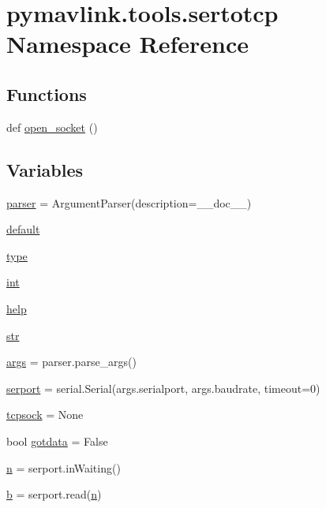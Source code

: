 \hypertarget{namespacepymavlink_1_1tools_1_1sertotcp}{}\section{pymavlink.\+tools.\+sertotcp Namespace Reference}
\label{namespacepymavlink_1_1tools_1_1sertotcp}
\subsection*{Functions}
\begin{DoxyCompactItemize}
\item 
def \mbox{\hyperlink{namespacepymavlink_1_1tools_1_1sertotcp_acea7267f0cbd70801a3173f386311131}{open\+\_\+socket}} ()
\end{DoxyCompactItemize}
\subsection*{Variables}
\begin{DoxyCompactItemize}
\item 
\mbox{\hyperlink{namespacepymavlink_1_1tools_1_1sertotcp_aa3dd094c6098a72b58a58bcedfee06ba}{parser}} = Argument\+Parser(description=\+\_\+\+\_\+doc\+\_\+\+\_\+)
\item 
\mbox{\hyperlink{namespacepymavlink_1_1tools_1_1sertotcp_a5155d3e9f5af677146f4631236d6db70}{default}}
\item 
\mbox{\hyperlink{namespacepymavlink_1_1tools_1_1sertotcp_a3e5a0995f5e8308207e66eb4b62913a2}{type}}
\item 
\mbox{\hyperlink{namespacepymavlink_1_1tools_1_1sertotcp_acc958c5fc9b5c4b8795b1b610ea3fdd4}{int}}
\item 
\mbox{\hyperlink{namespacepymavlink_1_1tools_1_1sertotcp_a4910fcac8e670df1cda872ceae80866a}{help}}
\item 
\mbox{\hyperlink{namespacepymavlink_1_1tools_1_1sertotcp_a36c01b1b7be097afcc65c2b1a0aaacbf}{str}}
\item 
\mbox{\hyperlink{namespacepymavlink_1_1tools_1_1sertotcp_ab233978b338bba7bac90e2e0ec6e4426}{args}} = parser.\+parse\+\_\+args()
\item 
\mbox{\hyperlink{namespacepymavlink_1_1tools_1_1sertotcp_ad5c3bf7886d1b09611a8fa7439774576}{serport}} = serial.\+Serial(args.\+serialport, args.\+baudrate, timeout=0)
\item 
\mbox{\hyperlink{namespacepymavlink_1_1tools_1_1sertotcp_ab50c30caa18849d8693fd3e379765605}{tcpsock}} = None
\item 
bool \mbox{\hyperlink{namespacepymavlink_1_1tools_1_1sertotcp_aa9236c906f0fd9eba4a3ba194992ca22}{gotdata}} = False
\item 
\mbox{\hyperlink{namespacepymavlink_1_1tools_1_1sertotcp_adef36cfc28a514a6fd90610647203385}{n}} = serport.\+in\+Waiting()
\item 
\mbox{\hyperlink{namespacepymavlink_1_1tools_1_1sertotcp_a71a94e54f6490e74e277b00e3e8c9680}{b}} = serport.\+read(\mbox{\hyperlink{namespacepymavlink_1_1tools_1_1sertotcp_adef36cfc28a514a6fd90610647203385}{n}})
\end{DoxyCompactItemize}


